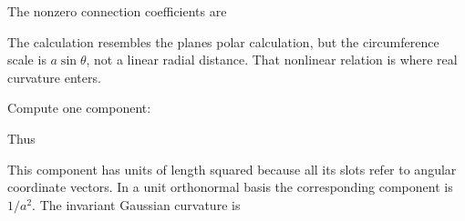 \documentclass[
  11pt,
  letterpaper,
  oneside,
  openany]{scrbook}
\begin{document}
\begin{center}
\begingroup
{}
\ifdim\wd\grmathbox>\linewidth
\resizebox{\linewidth}{!}{\usebox{\grmathbox}}
\else\usebox{\grmathbox}\fi
\endgroup
\end{center}

The nonzero connection coefficients are

\begin{center}
\begingroup
{}
\ifdim\wd\grmathbox>\linewidth
\resizebox{\linewidth}{!}{\usebox{\grmathbox}}
\else\usebox{\grmathbox}\fi
\endgroup
\end{center}

The calculation resembles the plane\textquotesingle s polar calculation,
but the circumference scale is \(a\sin\theta\), not a linear radial
distance. That nonlinear relation is where real curvature enters.

Compute one component:

\begin{center}
\begingroup
{}
\ifdim\wd\grmathbox>\linewidth
\resizebox{\linewidth}{!}{\usebox{\grmathbox}}
\else\usebox{\grmathbox}\fi
\endgroup
\end{center}

Thus

\begin{center}
\begingroup
{}
\ifdim\wd\grmathbox>\linewidth
\resizebox{\linewidth}{!}{\usebox{\grmathbox}}
\else\usebox{\grmathbox}\fi
\endgroup
\end{center}

This component has units of length squared because all its slots refer
to angular coordinate vectors. In a unit orthonormal basis the
corresponding component is \(1/a^2\). The invariant Gaussian curvature
is
\end{document}
